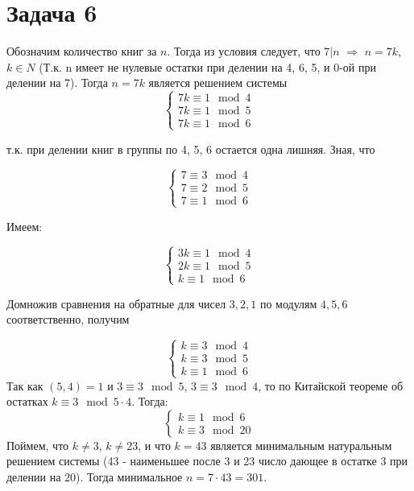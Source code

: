 \documentclass{article}
\begin{document}
		  \section {Задача 6}	
		  Обозначим количество книг за $n$. Тогда из условия следует, что $7 | n$ $\Rightarrow$ $n = 7k$, $k \in N$ (Т.к. n имеет не нулевые остатки при делении на 4, 6, 5, и 0-ой при делении на 7). Тогда $n = 7k$ является решением системы 
		  \begin{equation*} 
			  \begin{cases}
			  7k \equiv 1 \mod 4 \\
			  7k \equiv 1 \mod 5 \\
			  7k \equiv 1 \mod 6
			  \end{cases}
		  \end{equation*}
		  
		  т.к. при делении книг в группы по 4, 5, 6 остается одна лишняя. Зная, что
		  
		  \begin{equation*} 
		  \begin{cases}
		  7 \equiv 3 \mod 4 \\
		  7 \equiv 2 \mod 5 \\
		  7 \equiv 1 \mod 6
		  \end{cases}
		  \end{equation*}
		  
		  Имеем:
		  
		  \begin{equation*} 
		  \begin{cases}
		  3k \equiv 1 \mod 4 \\
		  2k \equiv 1 \mod 5 \\
		  k  \equiv 1 \mod 6
		  \end{cases}
		  \end{equation*}
		  
		  Домножив сравнения на обратные для чисел $3, 2, 1$ по модулям $4, 5, 6$ соответственно, получим
		  
		  \begin{equation*} 
		  \begin{cases}
		  k \equiv 3 \mod 4 \\
		  k \equiv 3 \mod 5 \\
		  k \equiv 1 \mod 6
		  \end{cases}
		  \end{equation*}
		  Так как $(5, 4) = 1$ и  $3 \equiv 3 \mod 5$, $3\equiv 3 \mod 4$, то по Китайской теореме об остатках $k \equiv 3 \mod 5\cdot 4$. Тогда:
		  \begin{equation*} 
		  \begin{cases}
		  k \equiv 1 \mod 6 \\
		  k \equiv 3 \mod 20
		  \end{cases}
		  \end{equation*}
		  Поймем, что $k \ne 3$, $k \ne 23$, и что $k=43$ является минимальным натуральным решением системы (43 - наименьшее после 3 и 23 число дающее в остатке 3 при делении на 20). Тогда минимальное $n = 7 \cdot 43 = 301$.
		  
\end{document}

